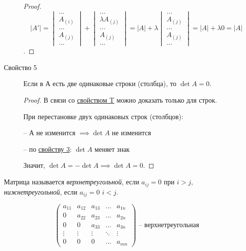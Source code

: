 \begin{description}
\begin{proof}
        \begin{equation*}
            |A'| = \begin{vmatrix}
                \dots \\ A_{(i)} \\ \dots \\ A_{(j)} \\ \dots
            \end{vmatrix} + \begin{vmatrix}
                \dots \\ \lambda A_{(j)} \\ \dots \\ A_{(j)} \\ \dots
            \end{vmatrix} = |A| + \lambda \begin{vmatrix}
                \dots \\ A_{(j)} \\ \dots \\ A_{(j)} \\ \dots
            \end{vmatrix} = |A| + \lambda 0 = |A|
        \end{equation*}.
    \end{proof}

\item[Свойство 5\label{det:prop_5}]
    Если в А есть две одинаковые строки (столбца), то $\det A = 0$.
    \begin{proof}
        В связи со \hyperref[det:prop_t]{свойством T} можно доказать только для строк.

        При перестановке двух одинаковых строк (столбцов):

        -- А не изменится $\implies \det A$ не изменится

        -- по \hyperref[det:prop_3]{свойству 3}: $\det A$ меняет знак

        Значит, $\det A = -\det A \implies \det A = 0$.
    \end{proof}
\end{description}

\begin{definition}
    Матрица называется \textit{верхнетреугольной}, если $a_{ij} = 0$ при $i > j$, \textit{нижнетреугольной}, если $a_{ij} = 0$ $i < j$.
\end{definition}
\begin{equation*}
    \begin{pmatrix}
        a_{11} & a_{12} & a_{13} & \dots & a_{1n} \\
        0 & a_{22} & a_{23} & \dots & a_{2n} \\
        0 & 0 & a_{33} & \dots & a_{3n} \\
        \vdots & \vdots & \vdots & \ddots & \vdots \\
        0 & 0 & 0 & \dots & a_{mn}
	\end{pmatrix} \text{ -- верхнетреугольная}
\end{equation*}

